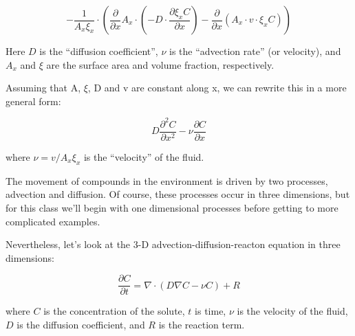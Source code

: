 \documentclass{tufte-handout}\usepackage[]{graphicx}\usepackage[]{xcolor}
\begin{document}

\begin{equation}
- \frac{1}{A_x \xi_x} \cdot \left( \frac{\partial}{\partial x} A_x \cdot \left( -D \cdot \frac{\partial \xi_x C}{\partial x} \right) - \frac{\partial}{\partial x} \left( A_x \cdot v \cdot \xi_x C \right) \right)
\end{equation}

Here $D$ is the ``diffusion coefficient'', $\nu$ is the ``advection rate'' (or velocity), and $A_x$ and $\xi$ are the surface area and volume fraction, respectively. 

Assuming that A, $\xi$, D and v are constant along x, we can rewrite this in a more general form: 

\begin{equation}
D \frac{\partial^2 C}{\partial x^2} - \nu \frac{\partial C}{\partial x}
\end{equation}

where $\nu = v/A_x \xi_x$ is the ``velocity'' of the fluid.

The movement of compounds in the environment is driven by two processes, advection and diffusion. Of course, these processes occur in three dimensions, but for this class we'll begin with one dimensional processes before getting to more complicated examples.

Nevertheless, let's look at the 3-D advection-diffusion-reacton equation in three dimensions:

\begin{equation}
\frac{\partial C}{\partial t} = \nabla \cdot (D\nabla C - \nu C) + R
\end{equation}

where $C$ is the concentration of the solute, $t$ is time, $\nu$ is the velocity of the fluid, $D$ is the diffusion coefficient, and $R$ is the reaction term.
\end{document}
